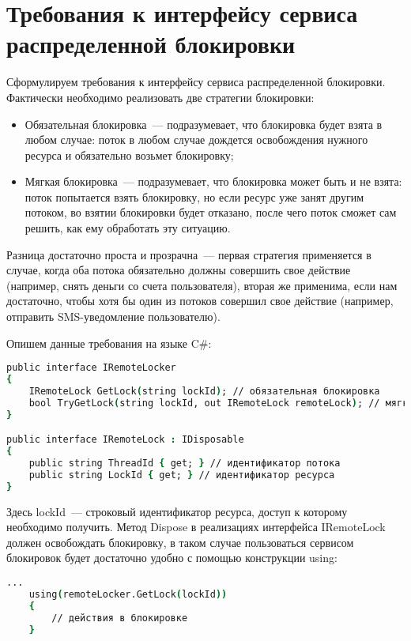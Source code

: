 \section{Требования к интерфейсу сервиса распределенной блокировки}

Сформулируем требования к интерфейсу сервиса распределенной блокировки. Фактически необходимо реализовать две стратегии блокировки:

\begin{itemize} 
	\item Обязательная блокировка~--- подразумевает, что блокировка будет взята в любом случае: поток в любом случае дождется освобождения нужного ресурса и обязательно возьмет блокировку;
	\item Мягкая блокировка~--- подразумевает, что блокировка может быть и не взята: поток попытается взять блокировку, но если ресурс уже занят другим потоком, во взятии блокировки будет отказано, после чего поток сможет сам решить, как ему обработать эту ситуацию.
\end{itemize}

Разница достаточно проста и прозрачна~--- первая стратегия применяется в случае, когда оба потока обязательно должны совершить свое действие (например, снять деньги со счета пользователя), вторая же применима, если нам достаточно, чтобы хотя бы один из потоков совершил свое действие (например, отправить SMS-уведомление пользователю). 

Опишем данные требования на языке C\#:

\begin{lstlisting}[language=csh,caption={Описание интерфейса}]
public interface IRemoteLocker
{
	IRemoteLock GetLock(string lockId); // обязательная блокировка
	bool TryGetLock(string lockId, out IRemoteLock remoteLock); // мягкая блокировка
}

public interface IRemoteLock : IDisposable
{
	public string ThreadId { get; } // идентификатор потока
	public string LockId { get; } // идентификатор ресурса
}
\end{lstlisting}

Здесь lockId~--- строковый идентификатор ресурса, доступ к которому необходимо получить. Метод Dispose в реализациях интерфейса IRemoteLock должен освобождать блокировку, в таком случае пользоваться сервисом блокировок будет достаточно удобно с помощью конструкции using:

\begin{lstlisting}[language=csh,caption={Использование конструкции using}]
	...
	using(remoteLocker.GetLock(lockId))
	{
		// действия в блокировке
	}
\end{lstlisting}
